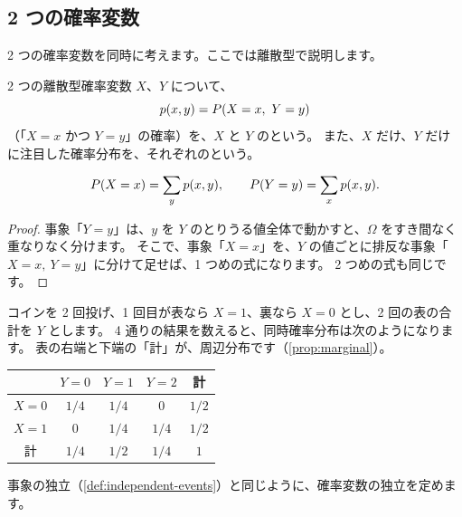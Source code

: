 \subsection{2 つの確率変数}

2 つの確率変数を同時に考えます。ここでは離散型で説明します。

\begin{definition}
  2 つの離散型確率変数 $X$、$Y$ について、
  \[
    p(x, y) = P(X = x,\ Y = y)
  \]
  （「$X = x$ かつ $Y = y$」の確率）を、$X$ と $Y$ のという。
  また、$X$ だけ、$Y$ だけに注目した確率分布を、それぞれのという。
\end{definition}

\begin{proposition}
  \[
    P(X = x) = \sum_{y} p(x, y), \qquad P(Y = y) = \sum_{x} p(x, y).
  \]
\end{proposition}

\begin{proof}
  事象「$Y = y$」は、$y$ を $Y$ のとりうる値全体で動かすと、$\Omega$ をすき間なく重なりなく分けます。
  そこで、事象「$X = x$」を、$Y$ の値ごとに排反な事象「$X = x,\ Y = y$」に分けて足せば、1 つめの式になります。
  2 つめの式も同じです。
\end{proof}

\begin{example}
  コインを 2 回投げ、1 回目が表なら $X = 1$、裏なら $X = 0$ とし、2 回の表の合計を $Y$ とします。
  4 通りの結果を数えると、同時確率分布は次のようになります。
  表の右端と下端の「計」が、周辺分布です（\cref{prop:marginal}）。
  \begin{center}
    \begin{tabular}{c|ccc|c}
      \toprule
      & $Y = 0$ & $Y = 1$ & $Y = 2$ & 計 \\
      \midrule
      $X = 0$ & $1/4$ & $1/4$ & $0$ & $1/2$ \\
      $X = 1$ & $0$ & $1/4$ & $1/4$ & $1/2$ \\
      \midrule
      計 & $1/4$ & $1/2$ & $1/4$ & $1$ \\
      \bottomrule
    \end{tabular}
  \end{center}
\end{example}

事象の独立（\cref{def:independent-events}）と同じように、確率変数の独立を定めます。

